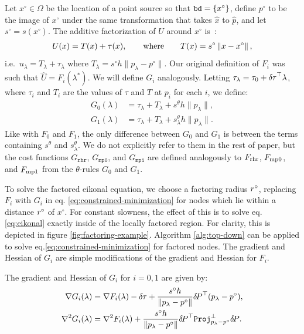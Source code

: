 \documentclass[smallcondensed]{svjour3}
\begin{document}
Let $x^\circ \in \Omega$ be the location of a point source so that
$\texttt{bd} = \left\{x^\circ\right\}$, define $p^\circ$ to be the image of
$x^\circ$ under the same transformation that takes $\hat{x}$ to
$\hat{p}$, and let $s^\circ = s(x^\circ)$. The additive factorization
of $U$ around $x^\circ$ is~\cite{luo2012fast,qi2018corner}:
\begin{align}
  U(x) = T(x) + \tau(x), \qquad \text{where} \qquad T(x) = s^\circ \left\|x - x^\circ\right\|,
\end{align}
i.e.\ $u_\lambda = T_\lambda + \tau_\lambda$ where
$T_\lambda = s^\circ h \|p_\lambda - p^\circ\|$. Our original definition of
$F_i$ was such that $\hat{U} = F_i(\lambda^*)$. We will
define $G_i$ analogously. Letting
$\tau_\lambda = \tau_0 + {\delta \hspace{-0.05em} \tau}^\top \lambda$, where $\tau_i$ and
$T_i$ are the values of $\tau$ and $T$ at $p_i$ for each $i$, we
define:
\begin{align}
  \label{eq:Gi}
  G_0(\lambda) &= \tau_\lambda + T_\lambda + s^\theta h \|p_\lambda\|, \\
  G_1(\lambda) &= \tau_\lambda + T_\lambda + s^\theta_\lambda h \|p_\lambda\|.
\end{align}
Like with $F_0$ and $F_1$, the only difference between $G_0$ and $G_1$
is between the terms containing $s^\theta$ and $s^\theta_\lambda$. We
do not explicitly refer to them in the rest of paper, but the cost
functions $G_{\texttt{rhr}}$, $G_{\texttt{mp0}}$, and
$G_{\texttt{mp1}}$ are defined analogously to $F_{\operatorname{rhr}}$, $F_{\operatorname{mp0}}$, and
$F_{\operatorname{mp1}}$ from the $\theta$-rules $G_0$ and $G_1$.

To solve the factored eikonal equation, we choose a factoring radius
$r^\circ$, replacing $F_i$ with $G_i$ in eq.\@
\ref{eq:constrained-minimization} for nodes which lie within a
distance $r^\circ$ of $x^\circ$. For constant slowness, the effect of
this is to solve eq.\@ \ref{eq:eikonal} exactly inside of the
locally factored region. For clarity, this is depicted in figure
\ref{fig:factoring-example}. Algorithm \ref{alg:top-down} can be
applied to solve eq.\@ \ref{eq:constrained-minimization} for
factored nodes. The gradient and Hessian of $G_i$ are simple
modifications of the gradient and Hessian for $F_i$.

\begin{lemma}
  The gradient and Hessian of $G_i$ for $i = 0, 1$ are given
  by:
  \begin{align}
    \label{eq:G-grad-hess}
    \nabla G_i(\lambda) &= \nabla F_i(\lambda) - {\delta \hspace{-0.05em} \tau} + \frac{s^\circ h}{\|p_\lambda - p^\circ\|} {\delta \hspace{-0.14em} P}^\top {(p_\lambda - p^\circ)}, \\
    \nabla^2 G_i(\lambda) &= \nabla^2 F_i(\lambda) + \frac{s^\circ h}{\|p_\lambda - p^\circ\|} {\delta \hspace{-0.14em} P}^\top \mathtt{Proj}^\perp_{p_\lambda - p^\circ} {\delta \hspace{-0.14em} P}.
  \end{align}
\end{lemma}
\end{document}
